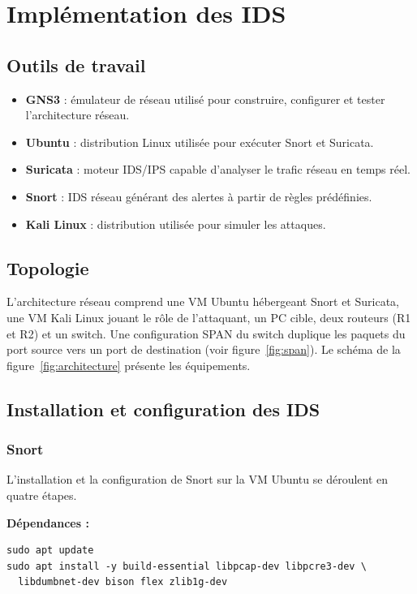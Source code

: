 \section{Implémentation des IDS}
\subsection{Outils de travail}
\begin{itemize}
\item \textbf{GNS3} : émulateur de réseau utilisé pour construire, configurer et tester l'architecture réseau.
\item \textbf{Ubuntu} : distribution Linux utilisée pour exécuter Snort et Suricata.
\item \textbf{Suricata} : moteur IDS/IPS capable d'analyser le trafic réseau en temps réel.
\item \textbf{Snort} : IDS réseau générant des alertes à partir de règles prédéfinies.
\item \textbf{Kali Linux} : distribution utilisée pour simuler les attaques.
\end{itemize}

\subsection{Topologie}
L'architecture réseau comprend une VM Ubuntu hébergeant Snort et Suricata, une VM Kali Linux jouant le rôle de l'attaquant, un PC cible, deux routeurs (R1 et R2) et un switch. Une configuration SPAN du switch duplique les paquets du port source vers un port de destination (voir figure~\ref{fig:span}). Le schéma de la figure~\ref{fig:architecture} présente les équipements.
\FloatBarrier

\subsection{Installation et configuration des IDS}
\subsubsection{Snort}
L'installation et la configuration de Snort sur la VM Ubuntu se déroulent en quatre étapes.

\textbf{Dépendances :}
\begin{verbatim}
sudo apt update
sudo apt install -y build-essential libpcap-dev libpcre3-dev \
  libdumbnet-dev bison flex zlib1g-dev
\end{verbatim}

